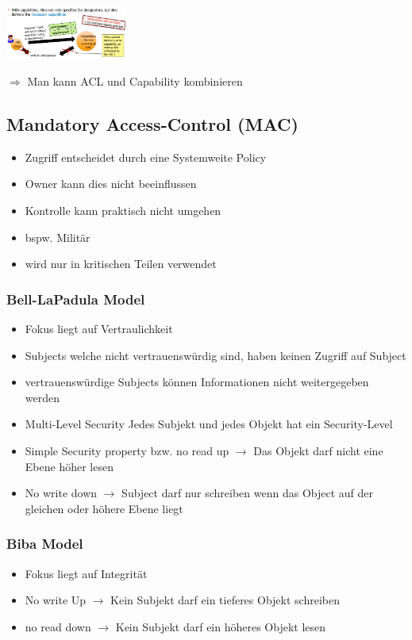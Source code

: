 \documentclass{report}
\newenvironment{Figure}
	{\par\medskip\noindent\minipage{\linewidth}}
	{\endminipage\par\medskip}
\theoremstyle{definition}
\theoremstyle{example}
\begin{document}
\begin{Figure}
\centering
\includegraphics[width=150px]{img/solveConfusedDeputyProblem.png}
	\label{fig:Abbildung der Lösung confused Deputy Problems}
\end{Figure}

$\Rightarrow$ Man kann ACL und Capability kombinieren


	\subsection{Mandatory Access-Control (MAC)}
\begin{itemize}
	\item Zugriff entscheidet durch eine Systemweite Policy
	\item Owner kann dies nicht beeinflussen
	\item Kontrolle kann praktisch nicht umgehen
	\item bspw. Militär
	\item wird nur in kritischen Teilen verwendet
\end{itemize}

		\subsubsection{Bell-LaPadula Model}
\begin{itemize}
	\item Fokus liegt auf Vertraulichkeit
	\item Subjects welche nicht vertrauenswürdig sind, haben keinen Zugriff auf Subject
	\item vertrauenswürdige Subjects können Informationen nicht weitergegeben werden
	\item Multi-Level Security Jedes Subjekt und jedes Objekt hat ein Security-Level
	\item Simple Security property bzw. no read up $\rightarrow$ Das Objekt darf nicht eine Ebene höher lesen
	\item No write down $\rightarrow$ Subject darf nur schreiben wenn das Object auf der gleichen oder höhere Ebene liegt
\end{itemize}

		\subsubsection{Biba Model}
\begin{itemize}
	\item Fokus liegt auf Integrität
	\item No write Up $\rightarrow$ Kein Subjekt darf ein tieferes Objekt schreiben
	\item no read down $\rightarrow$ Kein Subjekt darf ein höheres Objekt lesen
\end{itemize}
\end{document}
